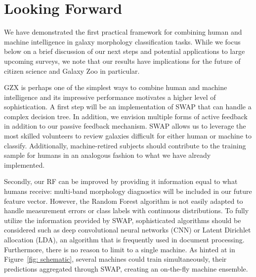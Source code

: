 \section{Looking Forward}\label{sec: visions}

We have demonstrated the first practical framework for combining human and machine
 intelligence in galaxy morphology classification tasks. 
While we focus below on a brief discussion of our next steps and potential applications
to large upcoming surveys, we note that our results have implications for the future
of citizen science and Galaxy Zoo in particular. 


GZX is perhaps one of the simplest ways to combine human and machine intelligence
 and its impressive performance motivates a higher level of sophistication. 
A first step will be an implementation of SWAP that can handle a complex decision tree. 
In addition, we envision multiple forms of active feedback in addition to 
our passive feedback mechanism.  SWAP allows us to leverage the 
most skilled volunteers to review galaxies difficult for either
 human or machine to classify.  Additionally, machine-retired subjects should 
contribute to the training sample for humans in an analogous fashion to what 
we have already implemented. 


Secondly, our RF can be improved by providing it information equal to what
humans receive: multi-band morphology diagnostics will be
included in our future feature vector.  However, the Random Forest algorithm is not 
easily adapted to handle measurement errors or class labels with continuous distributions. 
To fully utilize the information provided by SWAP, sophisticated algorithms should be considered such as 
deep convolutional neural networks (CNN) or Latent Dirichlet allocation (LDA), 
an algorithm that is frequently used in document processing.  
Furthermore, there is no reason to limit to a single machine. 
As hinted at in Figure~\ref{fig: schematic}, several machines could train simultaneously, 
their predictions aggregated through SWAP, creating an on-the-fly machine ensemble.


